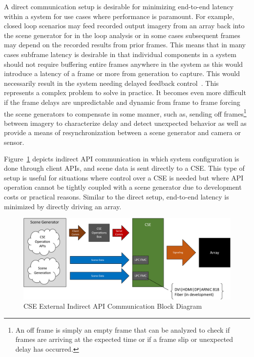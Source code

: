         A direct communication setup is desirable for minimizing end-to-end latency within a system for use cases where performance is paramount. For example, closed loop scenarios may feed recorded output imagery from an array back into the scene generator for in the loop analysis or in some cases subsequent frames may depend on the recorded results from prior frames. This means that in many cases subframe latency is desirable in that individual components in a system should not require buffering entire frames anywhere in the system as this would introduce a latency of a frame or more from generation to capture. This would necessarily result in the system needing delayed feedback control~\cite{HuWang2002}. This represents a complex problem to solve in practice. It becomes even more difficult if the frame delays are unpredictable and dynamic from frame to frame forcing the scene generators to compensate in some manner, such as, sending off frames\footnote{An off frame is simply an empty frame that can be analyzed to check if frames are arriving at the expected time or if a frame slip or unexpected delay has occurred.} between imagery to characterize delay and detect unexpected behavior as well as provide a means of resynchronization between a scene generator and camera or sensor.

        Figure~\ref{fig:external_cse_comm_half_indirect} depicts indirect API communication in which system configuration is done through client APIs, and scene data is sent directly to a CSE. This type of setup is useful for situations where control over a CSE is needed but where API operation cannot be tightly coupled with a scene generator due to development costs or practical reasons. Similar to the direct setup, end-to-end latency is minimized by directly driving an array.

        \begin{figure}
            \centering
            \includegraphics[width=1.0\textwidth]{fig/external_cse_comm_half_indirect.pdf}
            \caption{CSE External Indirect API Communication Block Diagram}
            \label{fig:external_cse_comm_half_indirect}
        \end{figure}

